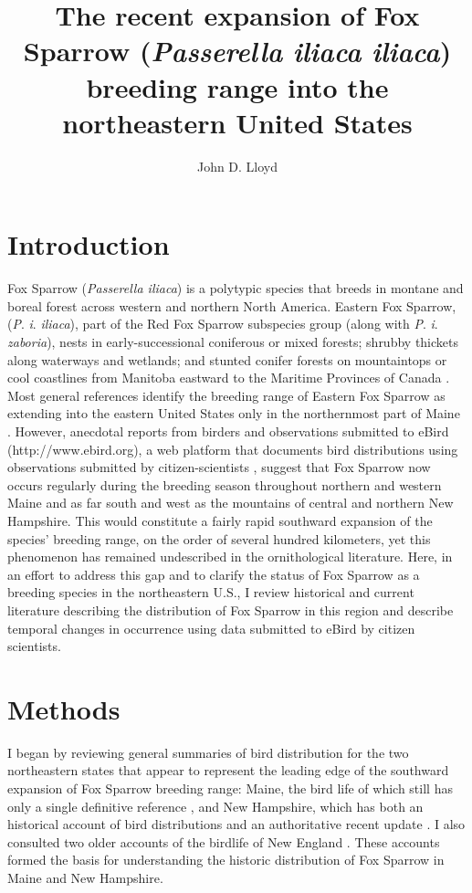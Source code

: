\documentclass[fleqn,10pt,lineno]{wlpeerj} %
\title{The recent expansion of Fox Sparrow (\textit{Passerella iliaca iliaca}) breeding range into the northeastern United States}
\author[1]{John D. Lloyd}
\affil[1]{Vermont Center for Ecostudies, Norwich, VT, USA}
\begin{document}
\flushbottom
\maketitle
\thispagestyle{empty}

\section*{Introduction}
Fox Sparrow (\textit{Passerella iliaca}) is a polytypic species that breeds in montane and boreal forest across western and northern North America. Eastern Fox Sparrow, (\textit{P}. \textit{i}. \textit{iliaca}), part of the Red Fox Sparrow subspecies group (along with \textit{P}. \textit{i}. \textit{zaboria}), nests in early-successional coniferous or mixed forests; shrubby thickets along waterways and wetlands; and stunted conifer forests on mountaintops or cool coastlines from Manitoba eastward to the Maritime Provinces of Canada \citep{Bisson1996-mp,McLaren2007-go,Stewart2015-id,Artuso2018-kd}. Most general references identify the breeding range of Eastern Fox Sparrow as extending into the eastern United States only in the northernmost part of Maine \citep{Rising1996-sy,Sibley2000-rs,Weckstein2002-px}. However, anecdotal reports from birders and observations submitted to eBird (http://www.ebird.org), a web platform that documents bird distributions using observations submitted by citizen-scientists \citep{sullivan2009ebird}, suggest that Fox Sparrow now occurs regularly during the breeding season throughout northern and western Maine and as far south and west as the mountains of central and northern New Hampshire. This would constitute a fairly rapid southward expansion of the species’ breeding range, on the order of several hundred kilometers, yet this phenomenon has remained undescribed in the ornithological literature. Here, in an effort to address this gap and to clarify the status of Fox Sparrow as a breeding species in the northeastern U.S., I review historical and current literature describing the distribution of Fox Sparrow in this region and describe temporal changes in occurrence using data submitted to eBird by citizen scientists. 

\section*{Methods}
I began by reviewing general summaries of bird distribution for the two northeastern states that appear to represent the leading edge of the southward expansion of Fox Sparrow breeding range: Maine, the bird life of which still has only a single definitive reference \citep{Palmer1949-ig}, and New Hampshire, which has both an historical account of bird distributions \citep{Allen1903-xq} and an authoritative recent update \citep{Keith2013-gt}. I also consulted two older accounts of the birdlife of New England \citep{Samuels1875-jo,Forbush1929-pq}. These accounts formed the basis for understanding the historic distribution of Fox Sparrow in Maine and New Hampshire. 
\end{document}
